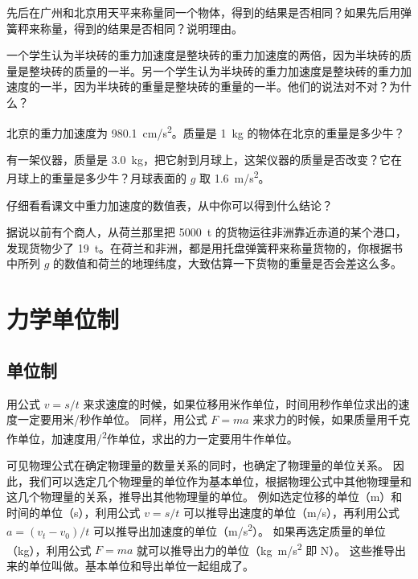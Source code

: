 \begin{Practice}
\begin{question}
\item 先后在广州和北京用天平来称量同一个物体，得到的结果是否相同？如果先后用弹簧秤来称量，得到的结果是否相同？说明理由。
\item 一个学生认为半块砖的重力加速度是整块砖的重力加速度的两倍，因为半块砖的质量是整块砖的质量的一半。另一个学生认为半块砖的重力加速度是整块砖的重力加速度的一半，因为半块砖的重量是整块砖的重量的一半。他们的说法对不对？为什么？
\item 北京的重力加速度为 \qty{980.1}{cm/s^2}。质量是 \qty{1}{kg} 的物体在北京的重量是多少牛？
\item 有一架仪器，质量是 \qty{3.0}{kg}，把它射到月球上，这架仪器的质量是否改变？它在月球上的重量是多少牛？月球表面的 $g$ 取 \qty{1.6}{m/s^2}。
\item 仔细看看课文中重力加速度的数值表，从中你可以得到什么结论？
\item 据说以前有个商人，从荷兰那里把 \qty{5000}{t} 的货物运往非洲靠近赤道的某个港口，发现货物少了 \qty{19}{t}。在荷兰和非洲，都是用托盘弹簧秤来称量货物的，你根据书中所列 $g$ 的数值和荷兰的地理纬度，大致估算一下货物的重量是否会差这么多。
\end{question}
\end{Practice}

\section{力学单位制}
\subsection{单位制}
用公式 $v=s/t$ 来求速度的时候，如果位移用米作单位，时间用秒作单位求出的速度一定要用米/秒作单位。
同样，用公式 $F=ma$ 来求力的时候，如果质量用千克作单位，加速度用\unit{/^2}作单位，求出的力一定要用牛作单位。

可见物理公式在确定物理量的数量关系的同时，也确定了物理量的单位关系。
因此，我们可以选定几个物理量的单位作为基本单位，根据物理公式中其他物理量和这几个物理量的关系，推导出其他物理量的单位。
例如选定位移的单位（\unit{m}）和时间的单位（\unit{s}），利用公式 $v=s/t$ 可以推导出速度的单位（\unit{m/s}），再利用公式 $a=(v_t-v_0)/t$ 可以推导出加速度的单位（\unit{m/s^2}）。
如果再选定质量的单位（\unit{kg}），利用公式 $F=ma$ 就可以推导出力的单位（\unit{kg.m/s^2} 即 \unit{N}）。
这些推导出来的单位叫做。基本单位和导出单位一起组成了。

